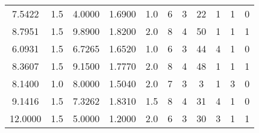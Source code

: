 \begin{table}[ht]
\begin{tabular}{ccccccccccc}
        7.5422 & 1.5 & 4.0000 & 1.6900 & 1.0 & 6 & 3 & 22 & 1 & 1 & 0 \\
        8.7951 & 1.5 & 9.8900 & 1.8200 & 2.0 & 8 & 4 & 50 & 1 & 1 & 1 \\
        6.0931 & 1.5 & 6.7265 & 1.6520 & 1.0 & 6 & 3 & 44 & 4 & 1 & 0 \\
        8.3607 & 1.5 & 9.1500 & 1.7770 & 2.0 & 8 & 4 & 48 & 1 & 1 & 1 \\
        8.1400 & 1.0 & 8.0000 & 1.5040 & 2.0 & 7 & 3 & 3 & 1 & 3 & 0 \\
        9.1416 & 1.5 & 7.3262 & 1.8310 & 1.5 & 8 & 4 & 31 & 4 & 1 & 0 \\
        12.0000 & 1.5 & 5.0000 & 1.2000 & 2.0 & 6 & 3 & 30 & 3 & 1 & 1 \\
        \hline
    \end{tabular}
\end{table}
